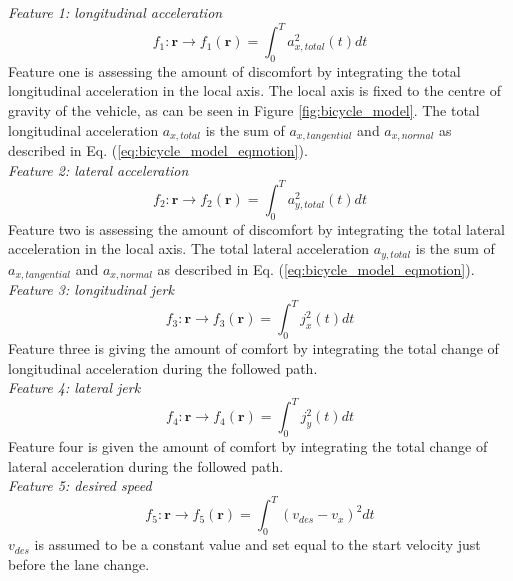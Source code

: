 \textit{Feature 1: longitudinal acceleration}
\begin{equation}\label{eq:flong_acc}
f_{1}:\bm{r}\xrightarrow{}f_1(\bm{r})=\int_{0}^{T}a_{x,total}^{2}(t) dt
\end{equation}
Feature one is assessing the amount of discomfort by integrating the total longitudinal acceleration in the local axis. The local axis is fixed to the centre of gravity of the vehicle, as can be seen in Figure \ref{fig:bicycle_model}. The total longitudinal acceleration  $a_{x,total} $ is the sum of  $ a_{x,tangential}$ and $a_{x,normal}$ as described in Eq. (\ref{eq:bicycle_model_eqmotion}). \\

\textit{Feature 2: lateral acceleration}
\begin{equation}\label{eq:flat_acc}
f_{2}:\bm{r}\xrightarrow{}f_2(\bm{r})=\int_{0}^{T}a_{y,total}^{2}(t) dt
\end{equation}
Feature two is assessing the amount of discomfort by integrating the total lateral acceleration in the local axis. The total lateral acceleration  $a_{y,total} $ is the sum of  $ a_{x,tangential}$ and $a_{x,normal}$ as described in Eq. (\ref{eq:bicycle_model_eqmotion}).\\

\textit{Feature 3: longitudinal jerk}
\begin{equation}\label{eq:flong_jerk}
f_{3}:\bm{r}\xrightarrow{}f_3(\bm{r})=\int_{0}^{T}j_x^{2}(t) dt
\end{equation}
Feature three is giving the amount of comfort by integrating the total change of longitudinal acceleration during the followed path. \\

\textit{Feature 4: lateral jerk}
\begin{equation}\label{eq:flat_jerk}
f_{4}:\bm{r}\xrightarrow{}f_4(\bm{r})=\int_{0}^{T}j_y^{2}(t) dt
\end{equation}
Feature four is given the amount of comfort by integrating the total change of lateral acceleration during the followed path. \\

\textit{Feature 5: desired speed}
\begin{equation}\label{eq:des_speed}
f_{5}:\bm{r}\xrightarrow{}f_5(\bm{r})=\int_{0}^{T}(v_{des}-v_x)^2 dt
\end{equation}
$v_{des}$ is assumed to be a constant value and set equal to the start velocity just before the lane change.\\

